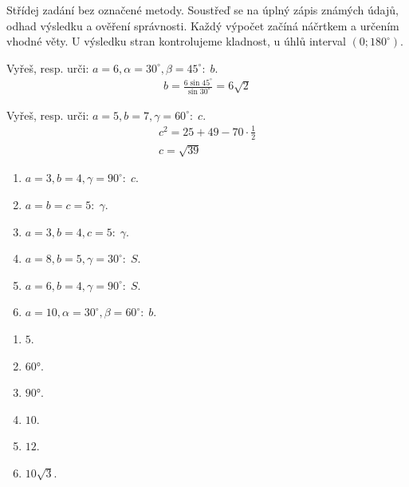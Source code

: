\documentclass[11pt,a4paper]{article}
\begin{document}
Střídej zadání bez označené metody. Soustřeď se na úplný zápis známých údajů, odhad výsledku a ověření správnosti.
Každý výpočet začíná náčrtkem a určením vhodné věty. U výsledku stran kontrolujeme kladnost, u úhlů interval $(0;180^\circ)$.
\begin{prikladReseniBox}[title={Příklad 1}]
Vyřeš, resp. urči: $a=6,\alpha=30^\circ,\beta=45^\circ:\;b$.
\tcblower
\[\begin{aligned}b=\frac{6\sin45^\circ}{\sin30^\circ}=6\sqrt2\end{aligned}\]
\end{prikladReseniBox}
\begin{prikladReseniBox}[title={Příklad 2}]
Vyřeš, resp. urči: $a=5,b=7,\gamma=60^\circ:\;c$.
\tcblower
\[\begin{aligned}c^2=25+49-70\cdot\frac{1}{2} \\ c=\sqrt{39}\end{aligned}\]
\end{prikladReseniBox}
\begin{zadaniReseniBox}[title={Samostatná práce 1}]
\begin{enumerate}[label=\alph*)]
\item $a=3,b=4,\gamma=90^\circ:\;c$.
\item $a=b=c=5:\;\gamma$.
\item $a=3,b=4,c=5:\;\gamma$.
\item $a=8,b=5,\gamma=30^\circ:\;S$.
\item $a=6,b=4,\gamma=90^\circ:\;S$.
\item $a=10,\alpha=30^\circ,\beta=60^\circ:\;b$.
\end{enumerate}
\tcblower
\begin{enumerate}[label=\alph*)]
\item $5$.
\item $60°$.
\item $90°$.
\item $10$.
\item $12$.
\item $10\sqrt3$.
\end{enumerate}
\end{zadaniReseniBox}
\end{document}
